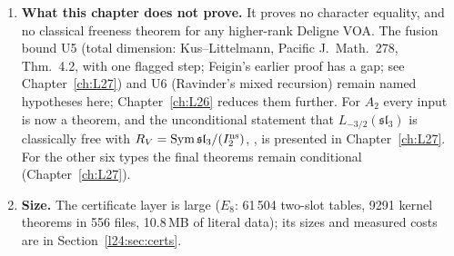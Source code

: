 \begin{enumerate}
  $\sum_p\dim\mathrm{Carrier}_{p,N}\le\mathcal D_N$ from U5 and U6.
\item \textbf{What this chapter does not prove.} It proves no character equality, and no classical
  freeness theorem for any higher-rank Deligne VOA. The fusion bound U5 (total dimension: Kus--Littelmann, Pacific J.\ Math.\ 278, Thm.~4.2, with one
  flagged step; Feigin's earlier proof has a gap; see Chapter~\ref{ch:L27}) and U6
  (Ravinder's mixed recursion) remain named hypotheses here; Chapter~\ref{ch:L26} reduces them further.
  For $A_2$ every input is now a theorem, and the unconditional statement that
  $L_{-3/2}(\mathfrak{sl}_3)$ is classically free with $R_V=\operatorname{Sym}\mathfrak{sl}_3/(I_2^{\mathrm{ns}})$,
  , is presented in Chapter~\ref{ch:L27}. For the other six types the
  final theorems remain conditional (Chapter~\ref{ch:L27}).
\item \textbf{Size.} The certificate layer is large ($E_8$: 61\,504 two-slot tables, 9291 kernel theorems in 556 files,
  10.8\,MB of literal data); its sizes and measured costs are in Section~\ref{l24:sec:certs}.
\end{enumerate}

